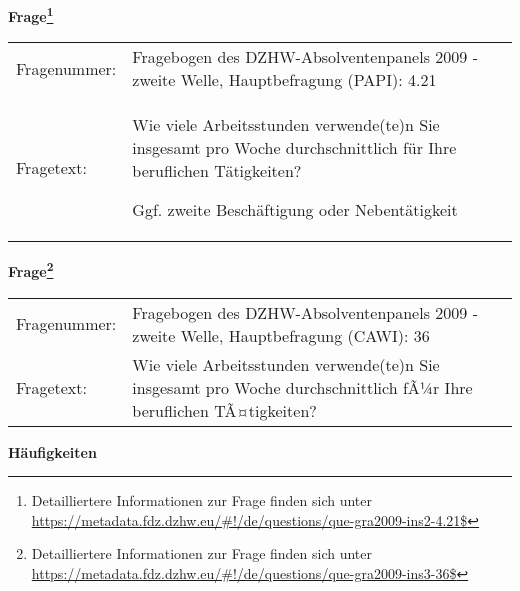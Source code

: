 				\vspace*{0.5cm}
                \noindent\textbf{Frage\footnote{Detailliertere Informationen zur Frage finden sich unter
		              \url{https://metadata.fdz.dzhw.eu/\#!/de/questions/que-gra2009-ins2-4.21$}}}\\
				\begin{tabularx}{\hsize}{@{}lX}
					Fragenummer: &
					  Fragebogen des DZHW-Absolventenpanels 2009 - zweite Welle, Hauptbefragung (PAPI):
					  4.21
 \\
					Fragetext: & Wie viele Arbeitsstunden verwende(te)n Sie insgesamt pro Woche durchschnittlich für Ihre beruflichen Tätigkeiten?\par  Ggf. zweite Beschäftigung oder Nebentätigkeit \\
				\end{tabularx}
				\vspace*{0.5cm}
                \noindent\textbf{Frage\footnote{Detailliertere Informationen zur Frage finden sich unter
		              \url{https://metadata.fdz.dzhw.eu/\#!/de/questions/que-gra2009-ins3-36$}}}\\
				\begin{tabularx}{\hsize}{@{}lX}
					Fragenummer: &
					  Fragebogen des DZHW-Absolventenpanels 2009 - zweite Welle, Hauptbefragung (CAWI):
					  36
 \\
					Fragetext: & Wie viele Arbeitsstunden verwende(te)n Sie insgesamt pro Woche durchschnittlich fÃ¼r Ihre beruflichen TÃ¤tigkeiten? \\
				\end{tabularx}





        		\vspace*{0.5cm}
                \noindent\textbf{Häufigkeiten}

